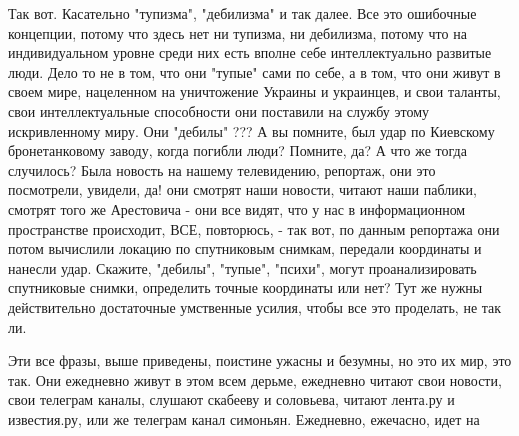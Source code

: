 Так вот. Касательно "тупизма", "дебилизма" и так далее. Все это ошибочные
концепции, потому что здесь нет ни тупизма, ни дебилизма, потому что на
индивидуальном уровне среди них есть вполне себе интеллектуально развитые люди.
Дело то не в том, что они "тупые" сами по себе, а в том, что они живут в своем
мире, нацеленном на уничтожение Украины и украинцев, и свои таланты, свои
интеллектуальные способности они поставили на службу этому искривленному миру.
Они "дебилы" ??? А вы помните, был удар по Киевскому бронетанковому заводу,
когда погибли люди? Помните, да? А что же тогда случилось? Была новость на
нашему телевидению, репортаж, они это посмотрели, увидели, да! они смотрят наши
новости, читают наши паблики, смотрят того же Арестовича - они все видят, что у
нас в информационном пространстве происходит, ВСЕ, повторюсь, - так вот, по
данным репортажа они потом вычислили локацию по спутниковым снимкам, передали
координаты и нанесли удар.  Скажите, "дебилы", "тупые", "психи", могут
проанализировать спутниковые снимки, определить точные координаты или нет?  Тут
же нужны действительно достаточные умственные усилия, чтобы все это проделать,
не так ли. 


Эти все фразы, выше приведены, поистине ужасны и безумны, но это их мир, это так.
Они ежедневно живут в этом всем дерьме, ежедневно читают свои новости, свои телеграм каналы,
слушают скабееву и соловьева, читают лента.ру и известия.ру, или же телеграм канал симоньян.
Ежедневно, ежечасно, идет на








